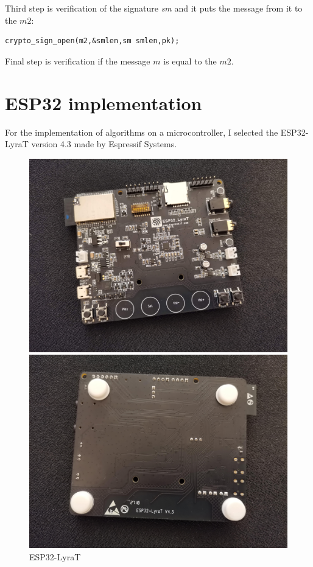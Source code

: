 \documentclass[thesis=M,english]{FITthesis}[2019/12/23]
\begin{document}
\bigskip
\noindent
Third step is verification of the signature \textit{sm} and it puts the message from it to the $m2$:
\begin{lstlisting}[frame=single]
crypto_sign_open(m2,&smlen,sm smlen,pk);
\end{lstlisting}

\noindent
Final step is verification if the message $m$ is equal to the $m2$.

\newpage
\section{ESP32 implementation} \label{ESP32_impl}
For the implementation of algorithms on a microcontroller, I selected the ESP32-LyraT version 4.3 made by Espressif Systems.

\iftrue
\begin{figure}[H]
\centering
\begin{minipage}{.5\textwidth}
\centering
\includegraphics[width=1\linewidth]{images/ESP32-LyraT-1.jpg}
\end{minipage}%
\begin{minipage}{.5\textwidth}
\centering
\includegraphics[width=1\linewidth]{images/ESP32-LyraT-2.jpg}
\end{minipage}
\caption{ESP32-LyraT}
\label{esp32-lyrat}
\end{figure}
\fi
\end{document}
